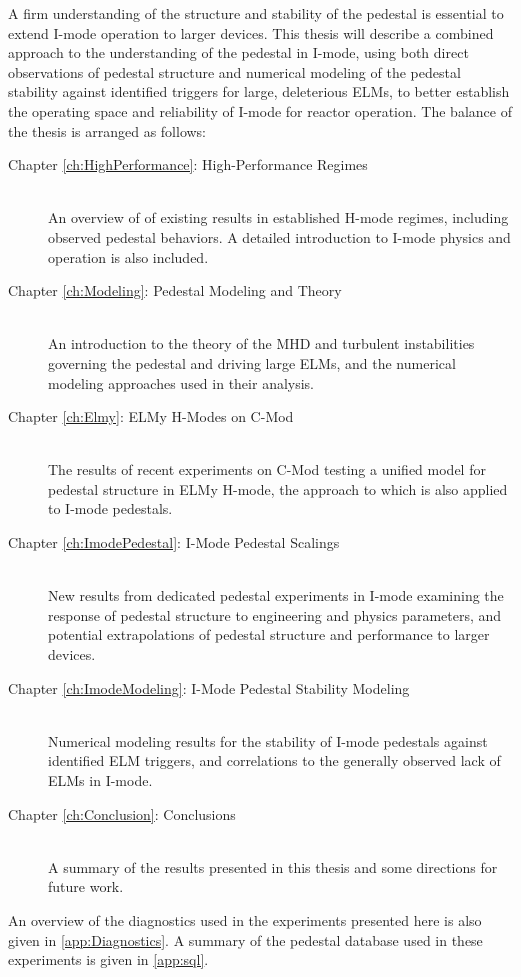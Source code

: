 A firm understanding of the structure and stability of the pedestal is essential to extend I-mode operation to larger devices.  This thesis will describe a combined approach to the understanding of the pedestal in I-mode, using both direct observations of pedestal structure and numerical modeling of the pedestal stability against identified triggers for large, deleterious ELMs, to better establish the operating space and reliability of I-mode for reactor operation.  The balance of the thesis is arranged as follows:

\begin{description}
 \item[Chapter \ref{ch:HighPerformance}: High-Performance Regimes] \hfill \\
 An overview of of existing results in established H-mode regimes, including observed pedestal behaviors.  A detailed introduction to I-mode physics and operation is also included.
 \item[Chapter \ref{ch:Modeling}: Pedestal Modeling and Theory] \hfill \\
 An introduction to the theory of the MHD and turbulent instabilities governing the pedestal and driving large ELMs, and the numerical modeling approaches used in their analysis.
 \item[Chapter \ref{ch:Elmy}: ELMy H-Modes on C-Mod] \hfill \\
 The results of recent experiments on C-Mod testing a unified model for pedestal structure in ELMy H-mode, the approach to which is also applied to I-mode pedestals.
 \item[Chapter \ref{ch:ImodePedestal}: I-Mode Pedestal Scalings] \hfill \\
 New results from dedicated pedestal experiments in I-mode examining the response of pedestal structure to engineering and physics parameters, and potential extrapolations of pedestal structure and performance to larger devices.
 \item[Chapter \ref{ch:ImodeModeling}: I-Mode Pedestal Stability Modeling] \hfill \\
 Numerical modeling results for the stability of I-mode pedestals against identified ELM triggers, and correlations to the generally observed lack of ELMs in I-mode.
 \item[Chapter \ref{ch:Conclusion}: Conclusions] \hfill \\
 A summary of the results presented in this thesis and some directions for future work.
\end{description}

\noindent An overview of the diagnostics used in the experiments presented here is also given in \cref{app:Diagnostics}.  A summary of the pedestal database used in these experiments is given in \cref{app:sql}.\nicechapterending



 